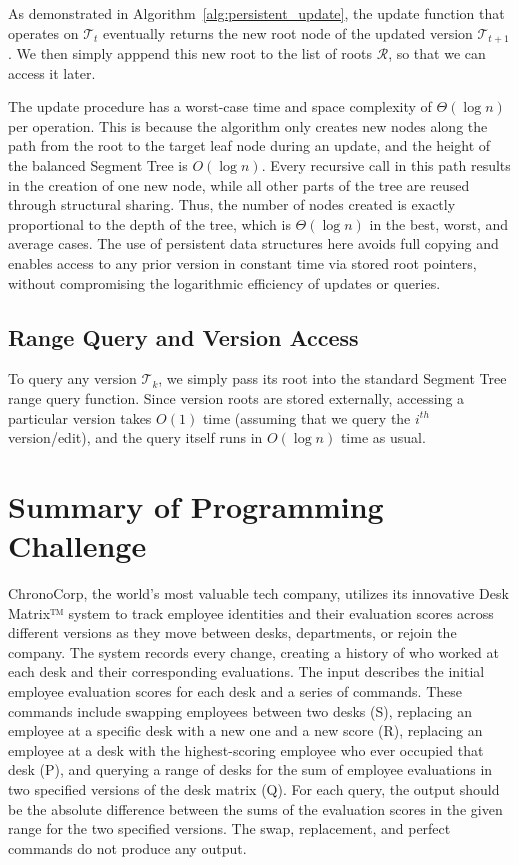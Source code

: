 \documentclass{fairmeta}
\numberwithin{equation}{section}
\begin{document}
As demonstrated in Algorithm~\ref{alg:persistent_update}, the update function that operates on $\mathcal{T}_t$ eventually returns the new root node of the updated version $\mathcal{T}_{t+1}$. We then simply apppend this new root to the list of roots $\mathcal{R}$, so that we can access it later.

The update procedure has a worst-case time and space complexity of $\Theta(\log n)$ per operation. This is because the algorithm only creates new nodes along the path from the root to the target leaf node during an update, and the height of the balanced Segment Tree is $O(\log n)$. Every recursive call in this path results in the creation of one new node, while all other parts of the tree are reused through structural sharing. Thus, the number of nodes created is exactly proportional to the depth of the tree, which is $\Theta(\log n)$ in the best, worst, and average cases. The use of persistent data structures here avoids full copying and enables access to any prior version in constant time via stored root pointers, without compromising the logarithmic efficiency of updates or queries.

\subsection*{Range Query and Version Access}

To query any version $\mathcal{T}_k$, we simply pass its root into the standard Segment Tree range query function. Since version roots are stored externally, accessing a particular version takes $O(1)$ time (assuming that we query the $i^{th}$ version/edit), and the query itself runs in $O(\log n)$ time as usual.

\section{Summary of Programming Challenge}

ChronoCorp, the world's most valuable tech company, utilizes its innovative Desk Matrix™ system to track employee identities and their evaluation scores across different versions as they move between desks, departments, or rejoin the company. The system records every change, creating a history of who worked at each desk and their corresponding evaluations. The input describes the initial employee evaluation scores for each desk and a series of commands. These commands include swapping employees between two desks (S), replacing an employee at a specific desk with a new one and a new score (R), replacing an employee at a desk with the highest-scoring employee who ever occupied that desk (P), and querying a range of desks for the sum of employee evaluations in two specified versions of the desk matrix (Q). For each query, the output should be the absolute difference between the sums of the evaluation scores in the given range for the two specified versions. The swap, replacement, and perfect commands do not produce any output.
\end{document}
